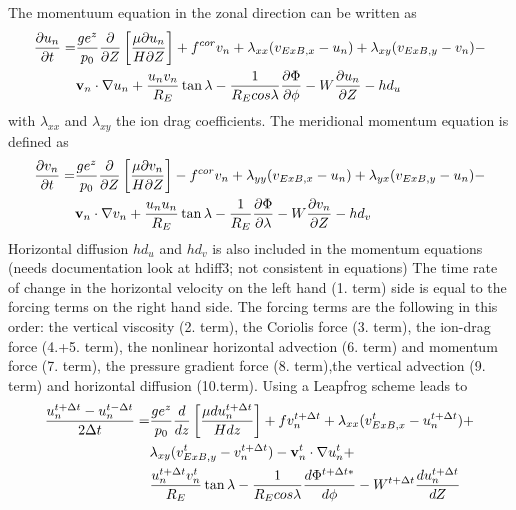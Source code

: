 The momentuum equation in the zonal direction can be written as
%
\begin{align}
   \frac{\partial u_n}{\partial t}=& \frac{g e^z}{p_0} \frac{\partial}{\partial Z}\left[
       \frac{\mu \partial u_n}{H \partial Z}\right] + f^{cor}v_n +
       \lambda_{xx}(v_{ExB,x}- u_n) + \lambda_{xy}(v_{ExB,y}- v_n) - \notag \\
       {} & \mathbf{v}_n\cdot
       \nabla u_n + \frac{u_n v_n}{R_E} \tan \lambda - \frac{1}{R_E cos
       \lambda} \frac{\partial \Phi}{\partial \phi} - W \frac{\partial u_n}{\partial Z} -hd_u
\end{align}
%
with $\lambda_{xx}$ and $\lambda_{xy}$ the ion drag coefficients.
 The meridional momentum equation is defined as
%
\begin{align}
   \frac{\partial v_n}{\partial t}=& \frac{g e^z}{p_0} \frac{\partial}{\partial Z}\left[
       \frac{\mu \partial v_n}{H \partial Z}\right] - f^{cor}v_n +
       \lambda_{yy}(v_{ExB,x}- u_n) + \lambda_{yx}(v_{ExB,y}- u_n) - \notag \\
       {} & \mathbf{v}_n\cdot
       \nabla v_n + \frac{u_n u_n}{R_E} \tan \lambda - \frac{1}{R_E}
       \frac{\partial \Phi}{\partial \lambda} - W \frac{\partial
       v_n}{\partial Z} -hd_v
\end{align}
%
Horizontal diffusion $hd_u$ and $hd_v$ is also included in the momentum equations (needs
documentation look at hdiff3; not consistent in equations)
The time rate of change in the horizontal velocity on the left hand
(1. term) side is equal to the forcing terms on the right hand
side. The forcing terms are the following in this order: the
vertical viscosity (2. term), the Coriolis force (3. term), the
ion-drag force (4.+5. term), the nonlinear horizontal advection (6.
term) and momentum force (7. term), the pressure gradient force (8.
term),the vertical advection (9. term) and horizontal diffusion (10.term). Using a Leapfrog
scheme leads to
%
\begin{align}
   \frac{ u_n^{t+ \Delta t}- u_n^{t-\Delta t}}{2 \Delta t}=& \frac{g e^z}{p_0} \frac{d}{d z}\left[
       \frac{\mu d u_n^{t+\Delta t}}{H d z}\right] + fv_n^{t+\Delta t} +
       \lambda_{xx}(v_{ExB,x}^t- u_n^{t+\Delta t}) + \notag \\
       {}& \lambda_{xy}(v_{ExB,y}^t- v_n^{t+\Delta t}) - \mathbf{v}_n^t\cdot
       \nabla u_n^t +  \\
       {}& \frac{u_n^{t+\Delta t} v_n^t}{R_E} \tan \lambda - \frac{1}{R_E cos
       \lambda} \frac{d \Phi^{t+\Delta t*}}{d \phi} - W^{t+\Delta t}
       \frac{d u_n^{t+\Delta t}}{d Z} \notag
\end{align}
